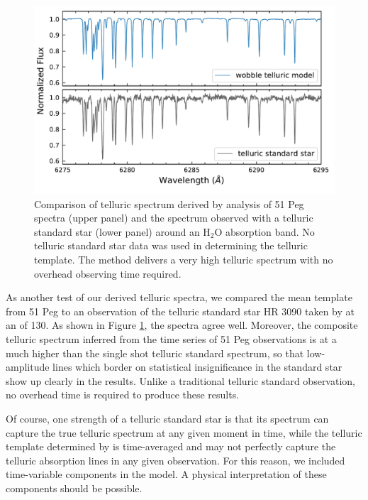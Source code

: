 \documentclass[modern]{aastex62}
\begin{document}
\begin{figure}
\centering
\includegraphics[width=5in]{telluric_standard}
\caption{Comparison of telluric spectrum derived by \wobble analysis of 51 Peg spectra (upper panel) and the spectrum observed with a telluric standard star (lower panel) around an H$_2$O absorption band. No telluric standard star data was used in determining the \wobble telluric template. The \wobble method delivers a very high \SNR telluric spectrum with no overhead observing time required.}
\label{fig:telluric_standard}
\end{figure}

As another test of our derived telluric spectra, we compared the mean template from 51 Peg to an observation of the telluric standard star HR 3090 taken by \HARPS at an \SNR of 130. 
As shown in Figure \ref{fig:telluric_standard}, the spectra agree well. 
Moreover, the composite telluric spectrum inferred from the time series of 51 Peg observations is at a much higher \SNR than the single shot telluric standard spectrum, so that low-amplitude lines which border on statistical insignificance in the standard star show up clearly in the \wobble results. 
Unlike a traditional telluric standard observation, no overhead time is required to produce these results.

Of course, one strength of a telluric standard star is that its spectrum can capture the true telluric spectrum at any given moment in time, while the telluric template determined by \wobble is time-averaged and may not perfectly capture the telluric absorption lines in any given observation. 
For this reason, we included time-variable components in the model. 
A physical interpretation of these components should be possible.
\end{document}
